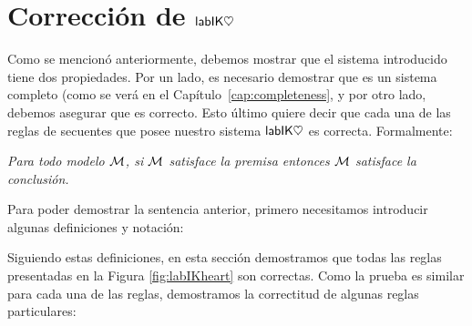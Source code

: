 \section{Corrección de $\mathsf{labIK\heartsuit}$}

Como se mencionó anteriormente, debemos mostrar que el sistema introducido tiene dos propiedades. Por un lado, es necesario demostrar que es un sistema completo (como se verá en el Capítulo~\ref{cap:completeness}, y por otro lado, debemos asegurar que es correcto. Esto último quiere decir que cada una de las reglas de secuentes que posee nuestro sistema $\mathsf{labIK\heartsuit}$ es correcta. Formalmente:

\begin{center}
	\emph{Para todo modelo $\mathcal{M}$, si $\mathcal{M}$ satisface la premisa entonces $\mathcal{M}$ satisface la conclusión.}
\end{center}

Para poder demostrar la sentencia anterior, primero necesitamos introducir algunas definiciones y notación:


\medskip
Siguiendo estas definiciones, en esta sección demostramos que todas las reglas presentadas en la Figura \ref{fig:labIKheart} son correctas. Como la prueba es similar para cada una de las reglas, demostramos la correctitud de algunas reglas particulares:


